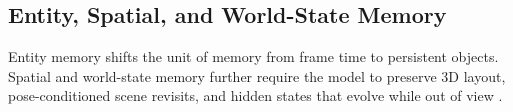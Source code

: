 \subsection{Entity, Spatial, and World-State Memory}
Entity memory shifts the unit of memory from frame time to persistent objects. Spatial and world-state memory further require the model to preserve 3D layout, pose-conditioned scene revisits, and hidden states that evolve while out of view \citep{iamflow2026,slotmemory2026,worldmem2025,spmem2025,liveworld2026,remind2026}.
